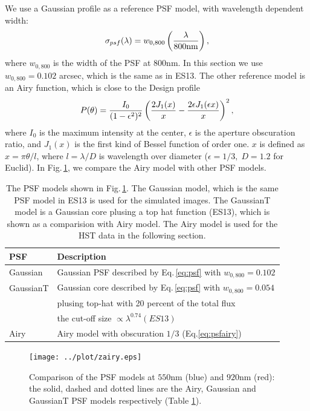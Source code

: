 \documentclass[useAMS,usenatbib]{mn2e}
\newcommand{\be}{\begin{equation}}
\newcommand{\ee}{\end{equation}}
\newcommand{\rund}[1]{\left(#1\right)}
\def\elabel#1{\label{eq:#1}}
\begin{document}
We use a Gaussian profile as a reference PSF model, with
wavelength dependent width:
%
\be
\sigma_{psf}(\lambda) = w_{0,800}\rund{\lambda \over 800{\rm nm}},
\elabel{psf}
\ee
%
where $w_{0,800}$ is the width of the PSF at $800$nm. In this section
we use $w_{0,800}=0.102$ arcsec, which is the same as in ES13. The
other reference model is an Airy function, which is close to the
Design profile \citep{2011arXiv1110.3193L}
%
\be
P(\theta) = {I_0 \over (1-\epsilon^2)^2} \rund{{2J_1(x)\over x} - {2\epsilon J_1(\epsilon x) \over x}}^2,
\elabel{psfairy}
\ee
%
where $I_0$ is the maximum intensity at the center, $\epsilon$ is the
aperture obscuration ratio, and $J_1(x)$ is the first kind of Bessel
function of order one. $x$ is defined as $x=\pi \theta/l$, where
$l=\lambda/D$ is wavelength over diameter ($\epsilon=1/3,\; D=1.2$ for
Euclid). In Fig.\,\ref{fig:psfmodel}, we compare the Airy model with
other PSF models.

%
\begin{table}
  \begin{tabular}{|l|l|}
    \hline\hline
    PSF  &Description\\
    \hline
    Gaussian &Gaussian PSF described by Eq.\,\ref{eq:psf} with $w_{0,800}=0.102$\\
    \hline
    GaussianT &Gaussian core described by Eq.\,\ref{eq:psf} with $w_{0,800}=0.054$\\
    &plusing top-hat with 20 percent of the total flux\\
    &the cut-off size $\propto\lambda^{0.74} (ES13)$\\
    \hline
    Airy  &Airy model with obscuration $1/3$ (Eq.\ref{eq:psfairy})\\
    \hline
  \end{tabular}
  \caption{\label{table:psfmodel}The PSF models shown in Fig.\,\ref{fig:psfmodel}. The Gaussian model, which is the same PSF model in ES13 is used for the simulated images. The GaussianT model is a Gaussian core plusing a top hat function (ES13), which is shown as a comparision with Airy model. The Airy model is used for the HST data in the following section.}
\end{table}
%
\begin{figure}
\centerline{\texttt{[image: ../plot/zairy.eps]}}
\caption{Comparison of the PSF models at $550$nm (blue) and $920$nm
  (red): the solid, dashed and dotted lines are the Airy, Gaussian and
  GaussianT PSF models respectively (Table \ref{table:psfmodel}).}
\label{fig:psfmodel}
\end{figure}
%
\end{document}
